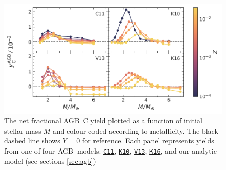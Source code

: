 \documentclass[fleqn,
usenatbib]{mnras}
\newcommand{\cxi}{\texttt{\hyperlink{C11}{C11}}}
\newcommand{\kx}{\texttt{\hyperlink{K10}{K10}}}
\newcommand{\kxvi}{\texttt{\hyperlink{K16}{K16}}}
\newcommand{\vxiii}{\texttt{\hyperlink{V13}{V13}}}
\newcommand{\agb}{AGB}
\newcommand{\y}{Y}
\begin{document}
\begin{figure}
    \centering
 	    \includegraphics[scale=1]{agb_yields.pdf}
        \caption[]{The net fractional \agb\ C yield  plotted as a function of initial stellar mass $M$ and colour-coded according to metallicity. The black dashed line shows $\y=0$ for reference. Each panel represents yields from one of four \agb\ models: \cxi{}, \kx{}, \vxiii{}, \kxvi{}, and our analytic model (see sections \ref{sec:agb}) }

        \label{fig:y_agb}
\end{figure}
\end{document}
